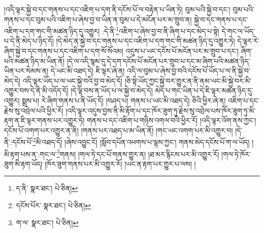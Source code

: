 །འདི་ལྟར་སྐྱེ་བ་དང་གནས་པ་དང་འཇིག་པ་དག་ནི་དངོས་པོ་ལ་བརྟེན་པ་ཡིན་ཏེ། བུམ་པའི་སྐྱེ་བ་དང་། བུམ་པའི་གནས་པ་དང་བུམ་པའི་འཇིག་པ་ཞེས་བྱ་བ་ཡིན་ན་བུམ་པ་དེ་མངོན་པར་མ་གྲུབ་ན། སྐྱེ་བ་དང་གནས་པ་དང་འཇིག་པ་དག་གང་གི་མཚན་ཉིད་དུ་འགྱུར། :དེ་ནི་\footnote{ད་ནི་  སྣར་ཐང་།  པེ་ཅིན། }འཇིག་པ་ཞེས་བྱ་བ་ནི་ཞིག་པ་དང་མེད་པ་སྟེ། དེ་གང་ལ་ཡོད་པ་དེ་ནི་མེད་པ་ཉིད་དོ། །དེ་མེད་ན་སྐྱེ་བ་དང་གནས་པ་དང་འཇིག་པ་དག་གང་གི་མཚན་ཉིད་དུ་འགྱུར་ཏེ། དེ་ལྟར་རེ་ཞིག་སྐྱེ་བ་དང་གནས་པ་དང་འཇིག་པ་དག་སོ་སོའམ། འདུས་པ་ཡང་དངོས་པོ་མངོན་པར་མ་གྲུབ་པ་དང་། ཞིག་པའི་མཚན་ཉིད་མ་ཡིན་ནོ། །དེ་ལ་འདི་སྙམ་དུ་དེ་དག་དངོས་པོ་མངོན་པར་གྲུབ་པ་དང་མ་ཞིག་པའི་མཚན་ཉིད་ཡིན་པར་སེམས་ན། དེ་ཡང་མི་འཐད་དེ། ཇི་ལྟར་ཞེ་ན། འདི་ལ་བུམ་པ་ཞེས་བྱ་བའི་དངོས་པོ་ཡོད་པ་ལ་ནི་སྐྱེ་བ་མེད་དེ། འདི་ལྟར་ཡོད་པ་ལ་ཡང་སྐྱེ་བའི་བྱ་བ་མེད་དོ། །ཅི་སྟེ་ཡོད་ཀྱང་སྐྱེ་བར་གྱུར་ན་ནི་ནམ་ཡང་མི་སྐྱེ་བར་མི་འགྱུར་བས་དེ་ནི་མི་འདོད་དོ། །དེ་ལྟ་བས་ན་ཡོད་པ་ལ་སྐྱེ་བ་མེད་དེ། མེད་པ་གང་ཡིན་པ་དེ་ཇི་ལྟར་མཚན་ཉིད་དུ་འགྱུར། སྨྲས་པ། རེ་ཞིག་གནས་པ་ནི་ཡོད་དོ། །བཤད་པ། གནས་པ་ཡང་མི་འཐད་དེ། ཅིའི་ཕྱིར་ཞེ་ན། འཇིག་པ་དང་རྗེས་སུ་འབྲེལ་པའི་ཕྱིར་རོ། །འདི་ལྟར་འདུས་བྱས་ནི་མི་རྟོག་པ་དང་ཁོར་ཟུག་ཏུ་རྗེས་སུ་འབྲེལ་པས་ཁོར་ཟུག་ཏུ་མི་རྟག་ན་ཇི་ལྟར་གནས་པར་འགྱུར་ཏེ། གནས་པ་དང་འཇིག་པ་གཉིས་འགལ་བའི་ཕྱིར་རོ། །འདི་ལྟར་འོག་ནས་ཀྱང་། དངོས་པོ་འགག་པར་འགྱུར་ན་ནི། །གནས་པར་འཐད་པ་མ་ཡིན་ནོ། །གང་ཡང་འགག་པར་མི་འགྱུར་བ། །དེ་ནི་:དངོས་པོ་\footnote{དངོས་པོར་  སྣར་ཐང་།  པེ་ཅིན། }མི་འཐད་དོ། །ཞེས་འབྱུང་ངོ། །སློབ་དཔོན་འཕགས་པ་ལྷས་ཀྱང་། གནས་མེད་དངོས་པོ་ག་ལ་ཡོད། །མི་རྟག་པས་ན་:གང་ལ་\footnote{ག་ལ་  སྣར་ཐང་།  པེ་ཅིན། }གནས། །གལ་ཏེ་དང་པོ་གནས་གྱུར་ན། །ཐ་མར་རྙིངས་པར་མི་འགྱུར་རོ། །གལ་ཏེ་ཁོར་ཟུག་མི་རྟག་ཡོད། །ཁོར་ཟུག་གནས་པར་མི་འགྱུར་རོ། །ཡང་ན་རྟག་པར་གྱུར་པ་ལས། །
